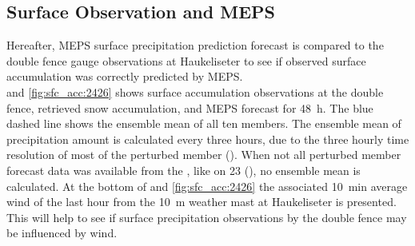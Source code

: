 \subsection{Surface Observation and MEPS}\label{sec:sfc_acc}
Hereafter, MEPS surface precipitation prediction forecast is compared to the double fence gauge observations at Haukeliseter to see if observed surface accumulation was correctly predicted by MEPS.
\\
 and \ref{fig:sfc_acc:2426} shows surface accumulation observations at the double fence, retrieved snow accumulation, and MEPS forecast for \SI{48}{\hour}. 
The blue dashed line shows the ensemble mean of all ten members. The ensemble mean of precipitation amount is calculated every three hours, due to the three hourly time resolution of most of the perturbed member ().
When not all perturbed member forecast data was available from the \citet{norwegian_meteorological_institute_met_2016}, like on \SI{23}{\dec} (), no ensemble mean is calculated. 
At the bottom of  and \ref{fig:sfc_acc:2426} the associated \SI{10}{\minute} average wind of the last hour from the \SI{10}{\metre} weather mast at Haukeliseter is presented. This will help to see if surface precipitation observations by the double fence may be influenced by wind. 
